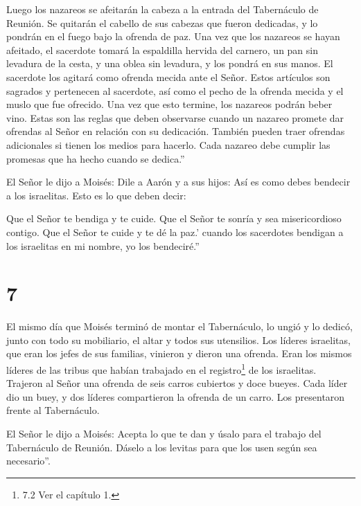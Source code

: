  Luego los nazareos se afeitarán la cabeza a la entrada del
Tabernáculo de Reunión. Se quitarán el cabello de sus cabezas que fueron
dedicadas, y lo pondrán en el fuego bajo la ofrenda de paz.
 Una vez que los nazareos se hayan afeitado, el sacerdote
tomará la espaldilla hervida del carnero, un pan sin levadura de la
cesta, y una oblea sin levadura, y los pondrá en sus manos.
 El sacerdote los agitará como ofrenda mecida ante el
Señor. Estos artículos son sagrados y pertenecen al sacerdote, así como
el pecho de la ofrenda mecida y el muslo que fue ofrecido. Una vez que
esto termine, los nazareos podrán beber vino.  Estas son
las reglas que deben observarse cuando un nazareo promete dar ofrendas
al Señor en relación con su dedicación. También pueden traer ofrendas
adicionales si tienen los medios para hacerlo. Cada nazareo debe cumplir
las promesas que ha hecho cuando se dedica.''

 El Señor le dijo a Moisés:  Dile a Aarón y a
sus hijos: Así es como debes bendecir a los israelitas. Esto es lo que
deben decir:

 Que el Señor te bendiga y te cuide.  Que el
Señor te sonría y sea misericordioso contigo.  Que el Señor
te cuide y te dé la paz.'  cuando los sacerdotes bendigan a
los israelitas en mi nombre, yo los bendeciré.''

\hypertarget{section-6}{%
\section{7}\label{section-6}}

 El mismo día que Moisés terminó de montar el Tabernáculo,
lo ungió y lo dedicó, junto con todo su mobiliario, el altar y todos sus
utensilios.  Los líderes israelitas, que eran los jefes de
sus familias, vinieron y dieron una ofrenda. Eran los mismos líderes de
las tribus que habían trabajado en el registro\footnote{7.2 Ver el
  capítulo 1.} de los israelitas.  Trajeron al Señor una
ofrenda de seis carros cubiertos y doce bueyes. Cada líder dio un buey,
y dos líderes compartieron la ofrenda de un carro. Los presentaron
frente al Tabernáculo.

 El Señor le dijo a Moisés:  Acepta lo que te
dan y úsalo para el trabajo del Tabernáculo de Reunión. Dáselo a los
levitas para que los usen según sea necesario''.

